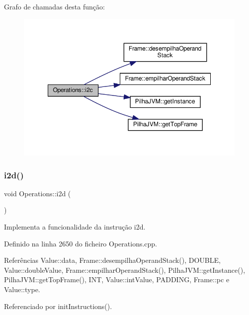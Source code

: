 Grafo de chamadas desta função\+:\nopagebreak
\begin{figure}[H]
\begin{center}
\leavevmode
\includegraphics[width=348pt]{classOperations_a43b01132bf9acf598d0ced8719c194c7_cgraph}
\end{center}
\end{figure}
\mbox{\label{classOperations_aee9ee24acc934bcf51340dc54d6ed231}} 
\subsubsection{\texorpdfstring{i2d()}{i2d()}}
{\footnotesize\ttfamily void Operations\+::i2d (\begin{DoxyParamCaption}{ }\end{DoxyParamCaption})\hspace{0.3cm}{\ttfamily [private]}}



Implementa a funcionalidade da instrução i2d. 



Definido na linha 2650 do ficheiro Operations.\+cpp.



Referências Value\+::data, Frame\+::desempilha\+Operand\+Stack(), D\+O\+U\+B\+LE, Value\+::double\+Value, Frame\+::empilhar\+Operand\+Stack(), Pilha\+J\+V\+M\+::get\+Instance(), Pilha\+J\+V\+M\+::get\+Top\+Frame(), I\+NT, Value\+::int\+Value, P\+A\+D\+D\+I\+NG, Frame\+::pc e Value\+::type.



Referenciado por init\+Instructions().

